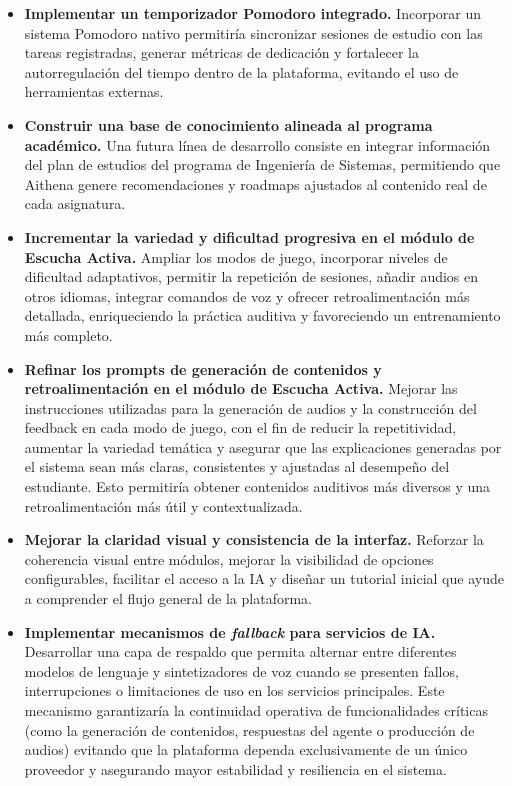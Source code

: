 \begin{itemize}
    \item \textbf{Implementar un temporizador Pomodoro integrado.}  
    Incorporar un sistema Pomodoro nativo permitiría sincronizar sesiones de estudio con las tareas registradas, generar métricas de dedicación y fortalecer la autorregulación del tiempo dentro de la plataforma, evitando el uso de herramientas externas.

    \item \textbf{Construir una base de conocimiento alineada al programa académico.}  
    Una futura línea de desarrollo consiste en integrar información del plan de estudios del programa de Ingeniería de Sistemas, permitiendo que Aithena genere recomendaciones y roadmaps ajustados al contenido real de cada asignatura.

    \item \textbf{Incrementar la variedad y dificultad progresiva en el módulo de Escucha Activa.}  
    Ampliar los modos de juego, incorporar niveles de dificultad adaptativos, permitir la repetición de sesiones, añadir audios en otros idiomas, integrar comandos de voz y ofrecer retroalimentación más detallada, enriqueciendo la práctica auditiva y favoreciendo un entrenamiento más completo.

    \item \textbf{Refinar los prompts de generación de contenidos y retroalimentación en el módulo de Escucha Activa.}  
    Mejorar las instrucciones utilizadas para la generación de audios y la construcción del feedback en cada modo de juego, con el fin de reducir la repetitividad, aumentar la variedad temática y asegurar que las explicaciones generadas por el sistema sean más claras, consistentes y ajustadas al desempeño del estudiante. Esto permitiría obtener contenidos auditivos más diversos y una retroalimentación más útil y contextualizada.


    \item \textbf{Mejorar la claridad visual y consistencia de la interfaz.}  
    Reforzar la coherencia visual entre módulos, mejorar la visibilidad de opciones configurables, facilitar el acceso a la IA y diseñar un tutorial inicial que ayude a comprender el flujo general de la plataforma.

    \item \textbf{Implementar mecanismos de \textit{fallback} para servicios de IA.}  
    Desarrollar una capa de respaldo que permita alternar entre diferentes modelos de lenguaje y sintetizadores de voz cuando se presenten fallos, interrupciones o limitaciones de uso en los servicios principales. Este mecanismo garantizaría la continuidad operativa de funcionalidades críticas (como la generación de contenidos, respuestas del agente o producción de audios) evitando que la plataforma dependa exclusivamente de un único proveedor y asegurando mayor estabilidad y resiliencia en el sistema.


\end{itemize}
